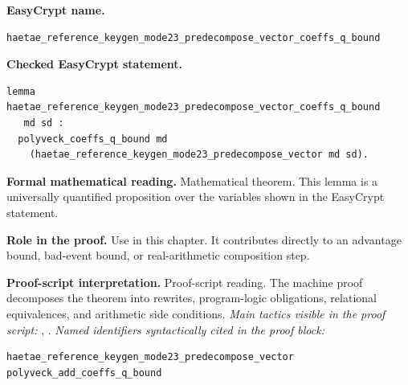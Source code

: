 \begin{formaltheorem}
\noindent\textbf{EasyCrypt name.}
\begin{lstlisting}[language=EasyCrypt,basicstyle=\ttfamily\scriptsize]
haetae_reference_keygen_mode23_predecompose_vector_coeffs_q_bound
\end{lstlisting}
\noindent\textbf{Checked EasyCrypt statement.}
\begin{lstlisting}[language=EasyCrypt,basicstyle=\ttfamily\scriptsize]
lemma haetae_reference_keygen_mode23_predecompose_vector_coeffs_q_bound
   md sd :
  polyveck_coeffs_q_bound md
    (haetae_reference_keygen_mode23_predecompose_vector md sd).
\end{lstlisting}
\noindent\textbf{Formal mathematical reading.}
Mathematical theorem. This lemma is a universally quantified proposition over the variables shown in the EasyCrypt statement.

\noindent\textbf{Role in the proof.}
Use in this chapter. It contributes directly to an advantage bound, bad-event bound, or real-arithmetic composition step.

\noindent\textbf{Proof-script interpretation.}
Proof-script reading. The machine proof decomposes the theorem into rewrites, program-logic obligations, relational equivalences, and arithmetic side conditions.
\emph{Main tactics visible in the proof script:} , .
\emph{Named identifiers syntactically cited in the proof block:}
\begin{lstlisting}[language=EasyCrypt,basicstyle=\ttfamily\scriptsize]
haetae_reference_keygen_mode23_predecompose_vector
polyveck_add_coeffs_q_bound
\end{lstlisting}

\end{formaltheorem}

